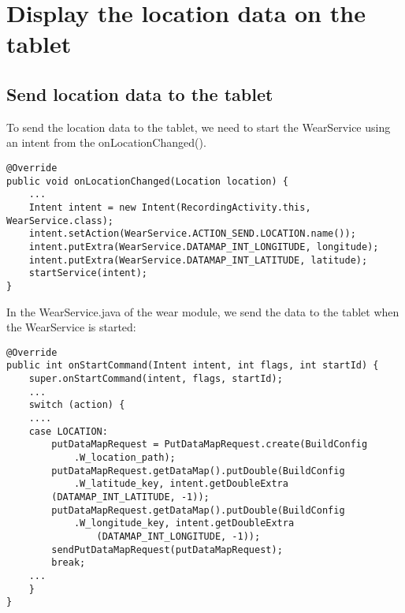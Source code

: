 \documentclass[11pt]{article}
\begin{document}
\section{Display the location data on the tablet}
\subsection{Send location data to the tablet}
To send the location data to the tablet, we need to start the WearService using an intent from the onLocationChanged().
\begin{lstlisting}
@Override
public void onLocationChanged(Location location) {
    ...
    Intent intent = new Intent(RecordingActivity.this, WearService.class);
    intent.setAction(WearService.ACTION_SEND.LOCATION.name());
    intent.putExtra(WearService.DATAMAP_INT_LONGITUDE, longitude);
    intent.putExtra(WearService.DATAMAP_INT_LATITUDE, latitude);
    startService(intent);
}
\end{lstlisting}
In the WearService.java of the wear module, we send the data to the tablet when the WearService is started:
\begin{lstlisting}
@Override
public int onStartCommand(Intent intent, int flags, int startId) {
    super.onStartCommand(intent, flags, startId);
    ...
    switch (action) {
    ....
    case LOCATION:
        putDataMapRequest = PutDataMapRequest.create(BuildConfig
            .W_location_path);
        putDataMapRequest.getDataMap().putDouble(BuildConfig
            .W_latitude_key, intent.getDoubleExtra
        (DATAMAP_INT_LATITUDE, -1));
        putDataMapRequest.getDataMap().putDouble(BuildConfig
            .W_longitude_key, intent.getDoubleExtra
                (DATAMAP_INT_LONGITUDE, -1));
        sendPutDataMapRequest(putDataMapRequest);
        break;
    ...
    }
}
\end{lstlisting}
\end{document}
